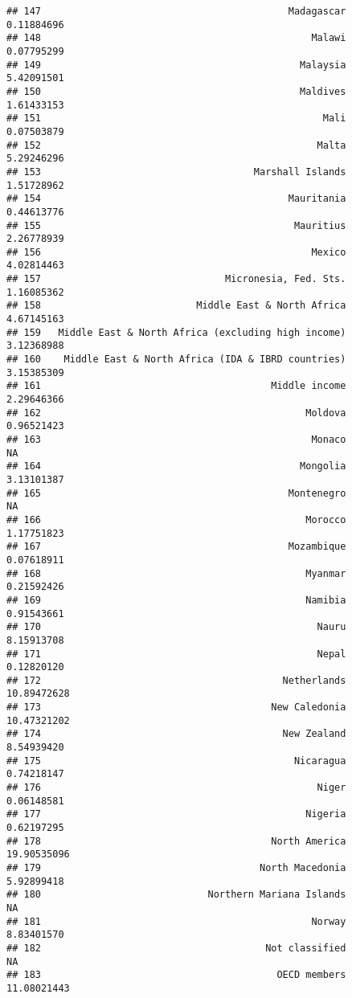 \documentclass[]{article}
\begin{document}
\begin{verbatim}
## 147                                           Madagascar  0.11884696
## 148                                               Malawi  0.07795299
## 149                                             Malaysia  5.42091501
## 150                                             Maldives  1.61433153
## 151                                                 Mali  0.07503879
## 152                                                Malta  5.29246296
## 153                                     Marshall Islands  1.51728962
## 154                                           Mauritania  0.44613776
## 155                                            Mauritius  2.26778939
## 156                                               Mexico  4.02814463
## 157                                Micronesia, Fed. Sts.  1.16085362
## 158                           Middle East & North Africa  4.67145163
## 159   Middle East & North Africa (excluding high income)  3.12368988
## 160    Middle East & North Africa (IDA & IBRD countries)  3.15385309
## 161                                        Middle income  2.29646366
## 162                                              Moldova  0.96521423
## 163                                               Monaco          NA
## 164                                             Mongolia  3.13101387
## 165                                           Montenegro          NA
## 166                                              Morocco  1.17751823
## 167                                           Mozambique  0.07618911
## 168                                              Myanmar  0.21592426
## 169                                              Namibia  0.91543661
## 170                                                Nauru  8.15913708
## 171                                                Nepal  0.12820120
## 172                                          Netherlands 10.89472628
## 173                                        New Caledonia 10.47321202
## 174                                          New Zealand  8.54939420
## 175                                            Nicaragua  0.74218147
## 176                                                Niger  0.06148581
## 177                                              Nigeria  0.62197295
## 178                                        North America 19.90535096
## 179                                      North Macedonia  5.92899418
## 180                             Northern Mariana Islands          NA
## 181                                               Norway  8.83401570
## 182                                       Not classified          NA
## 183                                         OECD members 11.08021443

\end{verbatim}
\end{document}
